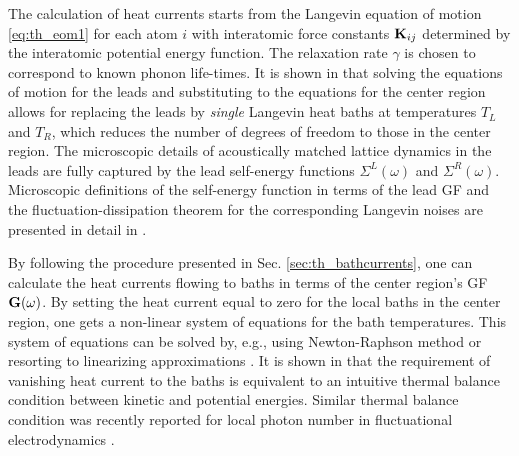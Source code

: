 The calculation of heat currents starts from the Langevin equation of motion \eqref{eq:th_eom1} for each atom $i$ with interatomic force constants $\mathbf{K}_{ij}$ determined by the interatomic potential energy function. The relaxation rate $\gamma$ is chosen to correspond to known phonon life-times. It is shown in  that solving the equations of motion for the leads and substituting to the equations for the center region allows for replacing the leads by \textit{single} Langevin heat baths at temperatures $T_L$ and $T_R$, which reduces the number of degrees of freedom to those in the center region. The microscopic details of acoustically matched lattice dynamics in the leads are fully captured by the lead self-energy functions $\Sigma^L(\omega)$ and $\Sigma^R(\omega)$. Microscopic definitions of the self-energy function in terms of the lead GF and the fluctuation-dissipation theorem for the corresponding Langevin noises are presented in detail in .

By following the procedure presented in Sec. \ref{sec:th_bathcurrents}, one can calculate the heat currents flowing to baths in terms of the center region's GF $\mathbf{G}(\omega)$. By setting the heat current equal to zero for the local baths in the center region, one gets a non-linear system of equations for the bath temperatures. This system of equations can be solved by, e.g., using Newton-Raphson method \cite{bandyopadhyay11} or resorting to linearizing approximations \cite{segal09}. It is shown in  that the requirement of vanishing heat current to the baths is equivalent to an intuitive thermal balance condition between kinetic and potential energies. Similar thermal balance condition was recently reported for local photon number in fluctuational electrodynamics \cite{partanen14}. 

